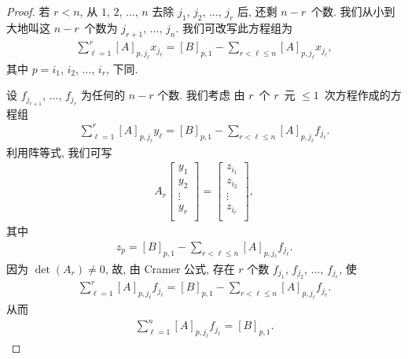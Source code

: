 \begin{proof}
    若 \(r < n\),
    从 \(1\), \(2\), \(\dots\), \(n\)
    去除 \(j_1\), \(j_2\), \(\dots\), \(j_r\)
    后, 还剩 \(n - r\)~个数.
    我们从小到大地叫这 \(n - r\)~个数为
    \(j_{r+1}\), \(\dots\), \(j_n\).
    我们可改写此方程组为
    \begin{align*}
        \sum_{\ell = 1}^{r}
        {[A]_{p,j_\ell} x_{j_\ell}}
            = [B]_{p,1}
        - \sum_{r < \ell \leq n}
        {[A]_{p,j_\ell} x_{j_\ell}},
    \end{align*}
    其中 \(p = i_1\), \(i_2\), \(\dots\), \(i_r\),
    下同.

    设
    \(f_{j_{r+1}}\), \(\dots\), \(f_{j_r}\)
    为任何的 \(n - r\) 个数.
    我们考虑%
    由 \(r\)~个 \(r\)~元 \({\leq} 1\)~次方程作成的方程组
    \begin{align*}
        \sum_{\ell = 1}^{r}
        {[A]_{p,j_\ell} y_\ell}
        = [B]_{p,1}
        - \sum_{r < \ell \leq n}
        {[A]_{p,j_\ell} f_{j_\ell}}.
    \end{align*}
    利用阵等式, 我们可写
    \begin{align*}
        A_r
        \begin{bmatrix}
            y_1    \\
            y_2    \\
            \vdots \\
            y_r    \\
        \end{bmatrix}
        =
        \begin{bmatrix}
            z_{i_1} \\
            z_{i_2} \\
            \vdots  \\
            z_{i_r} \\
        \end{bmatrix},
    \end{align*}
    其中
    \begin{align*}
        z_p = [B]_{p,1}
        - \sum_{r < \ell \leq n}
        {[A]_{p,j_\ell} f_{j_\ell}}.
    \end{align*}
    因为 \(\det {(A_r)} \neq 0\),
    故, 由 Cramer 公式,
    存在 \(r\) 个数
    \(f_{j_1}\), \(f_{j_2}\), \(\dots\), \(f_{j_r}\),
    使
    \begin{align*}
        \sum_{\ell = 1}^{r}
        {[A]_{p,j_\ell} f_{j_\ell}}
            = [B]_{p,1}
        - \sum_{r < \ell \leq n}
        {[A]_{p,j_\ell} f_{j_\ell}}.
    \end{align*}
    从而
    \begin{align*}
        \sum_{\ell = 1}^{n}
        {[A]_{p,j_\ell} f_{j_\ell}}
            = [B]_{p,1}.
    \end{align*}


\end{proof}
